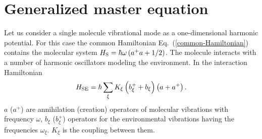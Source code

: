 \documentclass[12pt,twoside,a4paper]{report}
\begin{document}
\section{Generalized master equation} \label{quant-GME}
Let us consider a single molecule vibrational mode as a one-dimensional
harmonic potential. 
For this case the common  Hamiltonian Eq.~(\ref{common-Hamiltonian})
contains the molecular system 
$H
 _{\rm 
     S}
        =
            \hbar 
            \omega 
                 \left(
                     a^{+}a+1/2
                 \right) $.
The molecule interacts with a number of harmonic
oscillators modeling the environment. In the interaction
Hamiltonian
\begin{equation}
  H
  _{{\rm SE}}
             =
                   \hbar 
                   \sum_\xi K_\xi 
                       \left( 
                           b_\xi ^{+}+b_\xi 
                       \right)
                       \left( 
                           a+a^{+}
                       \right).  
\label{HO-Eq-linear-coupling}
\end{equation}
$a$ ($a^{+}$) are annihilation (creation) operators of molecular
vibrations with frequency $\omega $, $b_\xi$ ($b_\xi ^{+}$) operators
for the environmental vibrations having the frequencies $\omega _\xi
$. $K_\xi $ is the coupling between them.  
\end{document}

